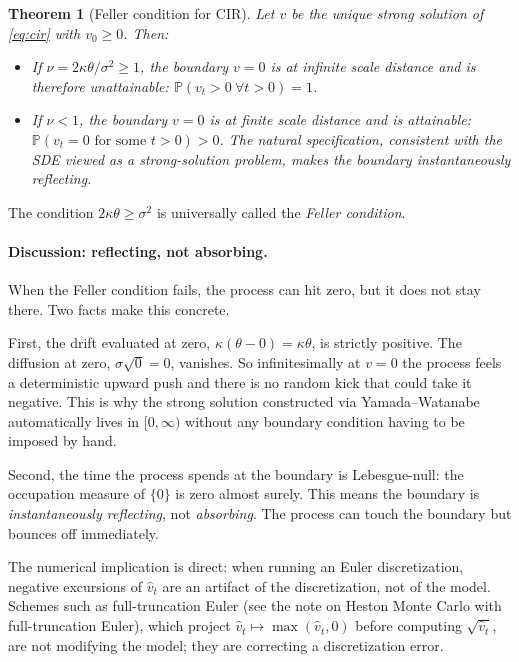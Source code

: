 \documentclass[11pt]{article}
\theoremstyle{plain}
\newtheorem{theorem}{Theorem}[section]
\theoremstyle{definition}
\theoremstyle{remark}
\begin{document}
\begin{theorem}[Feller condition for CIR]\label{thm:feller}
    Let \(v\) be the unique strong solution of \eqref{eq:cir} with \(v_0 \geq 0\). Then:
    \begin{itemize}[topsep=2pt]
        \item If \(\nu = 2\kappa\theta/\sigma^2 \geq 1\), the boundary \(v = 0\) is at infinite scale distance and is therefore \emph{unattainable}: \(\mathbb{P}(v_t > 0\ \forall t > 0) = 1\).
        \item If \(\nu < 1\), the boundary \(v = 0\) is at finite scale distance and is \emph{attainable}: \(\mathbb{P}(v_t = 0 \text{ for some } t > 0) > 0\). The natural specification, consistent with the SDE viewed as a strong-solution problem, makes the boundary \emph{instantaneously reflecting}.
    \end{itemize}
\end{theorem}

The condition \(2\kappa\theta \geq \sigma^2\) is universally called the \emph{Feller condition}.

\paragraph{Discussion: reflecting, not absorbing.}
When the Feller condition fails, the process can hit zero, but it does not stay there. Two facts make this concrete.

First, the drift evaluated at zero, \(\kappa(\theta - 0) = \kappa\theta\), is strictly positive. The diffusion at zero, \(\sigma\sqrt{0} = 0\), vanishes. So infinitesimally at \(v = 0\) the process feels a deterministic upward push and there is no random kick that could take it negative. This is why the strong solution constructed via Yamada--Watanabe automatically lives in \([0, \infty)\) without any boundary condition having to be imposed by hand.

Second, the time the process spends at the boundary is Lebesgue-null: the occupation measure of \(\{0\}\) is zero almost surely. This means the boundary is \emph{instantaneously reflecting}, not \emph{absorbing}. The process can touch the boundary but bounces off immediately.

The numerical implication is direct: when running an Euler discretization, negative excursions of \(\hat v_t\) are an artifact of the discretization, not of the model. Schemes such as full-truncation Euler (see the note on Heston Monte Carlo with full-truncation Euler), which project \(\hat v_t \mapsto \max(\hat v_t, 0)\) before computing \(\sqrt{\hat v_t}\), are not modifying the model; they are correcting a discretization error.
\end{document}
